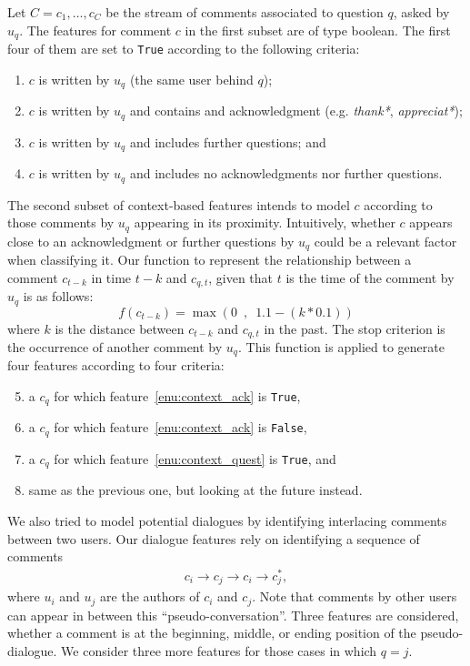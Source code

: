 Let $C={c_1, \ldots,c_C}$ be the stream of comments associated to question $q$, 
asked by $u_q$. The features for comment $c$ in the first subset are of type 
boolean. The first four of them are set to \texttt{True} according to the 
following criteria:

\begin{enumerate}
\item $c$ is written by $u_q$ (\ie the same user behind $q$); 
\item \label{enu:context_ack} 
  $c$ is written by $u_q$ and contains and acknowledgment (e.g.   
  \textit{thank*}, \textit{appreciat*});
\item \label{enu:context_quest}
  $c$ is written by $u_q$ and includes further questions; and
\item $c$ is written by $u_q$ and includes no acknowledgments nor further 
questions.
\end{enumerate}
% 
The second subset of context-based features intends to model $c$ according to 
those comments by $u_q$ appearing in its proximity. Intuitively, whether $c$ 
appears close to an acknowledgment or further questions by $u_q$ could be a 
relevant factor when classifying it. Our function to represent the relationship 
between a comment $c_{t-k}$ in time $t-k$ and $c_{q,t}$, given that $t$ is the 
time of the comment by $u_q$ is as follows:
% 
\begin{equation}
 f(c_{t-k})=\max \left(0\enspace,\enspace 1.1-(k*0.1) \right)
\end{equation}
%
where $k$ is the distance between $c_{t-k}$ and $c_{q,t}$ in the past. The stop 
criterion is the occurrence of another comment by $u_q$. This function 
is applied to generate four features according to four criteria:

\begin{enumerate}\setcounter{enumi}{4}
\item a $c_q$ for which feature~\ref{enu:context_ack} is \texttt{True},
\item a $c_q$ for which feature~\ref{enu:context_ack} is \texttt{False}, 
\item a $c_q$ for which feature~\ref{enu:context_quest} is \texttt{True}, and 
\item same as the previous one, but looking at the future instead. 
\end{enumerate}


We also tried to model potential dialogues by identifying interlacing comments 
between two users. Our dialogue features rely on identifying 
a sequence of comments 
\begin{align*}
c_i \rightarrow c_j \rightarrow c_i \rightarrow c_j^*,
\end{align*}
% 
where $u_i$ and $u_j$ are the authors of $c_i$ and $c_j$. 
Note that comments by other 
users can appear in between this ``pseudo-conversation''. Three features are 
considered, whether a comment is at the beginning, middle, or ending position of 
the pseudo-dialogue. We consider three more features for those cases in which 
$q=j$. 

